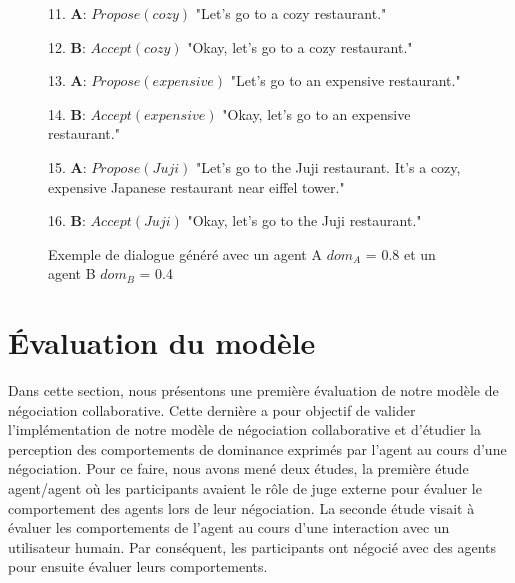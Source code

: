 \begin{figure}[!t]
\begin{minipage}{\textwidth}
{\begin{addmargin}[1em]{2em}
					
					11. \textbf{A}: $Propose(cozy)$ "Let's go to a cozy restaurant."
					
					
					12. \hspace*{3mm}\textbf{B}: $Accept(cozy)$ "Okay, let's go to a cozy  \hspace*{4mm} restaurant."
					
					
					13. \textbf{A}: $Propose(expensive)$ "Let's go to an expensive \hspace*{3mm} restaurant."
					
					
					14. \hspace*{3mm}\textbf{B}: $Accept(expensive)$ "Okay, let's go to\hspace*{4mm} an expensive restaurant."
					
					
					15. \textbf{A}: $Propose(Juji)$ "Let's go to the Juji restaurant. \hspace*{3mm} It's a cozy, expensive Japanese restaurant \hspace*{3mm} near eiffel tower."
					
					
					16. \hspace*{3mm}\textbf{B}: $Accept(Juji)$ "Okay, let's go to the Juji \hspace*{4mm} restaurant."
					\vspace{0.5 em}
				\end{addmargin}
			}
	\end{minipage}
			\caption{\label{fig: ex-dialogue} Exemple de dialogue généré avec un agent A $dom_A$ = 0.8 et un agent B $dom_B$ = 0.4}
\end{figure}
	
	\section{Évaluation du modèle}
		
		Dans cette section, nous présentons une première évaluation de notre modèle de négociation collaborative. Cette dernière a pour objectif de valider l'implémentation de notre modèle de négociation collaborative et d'étudier la perception des comportements de dominance exprimés par l'agent au cours d'une négociation. 
		Pour ce faire, nous avons mené deux études, la première étude agent/agent où les participants avaient le rôle de juge externe pour évaluer le comportement des agents lors de leur négociation.
		La seconde étude visait à évaluer les comportements de l'agent au cours d'une interaction avec un utilisateur humain. Par conséquent, les participants ont négocié avec des agents pour ensuite évaluer leurs comportements. 
		
